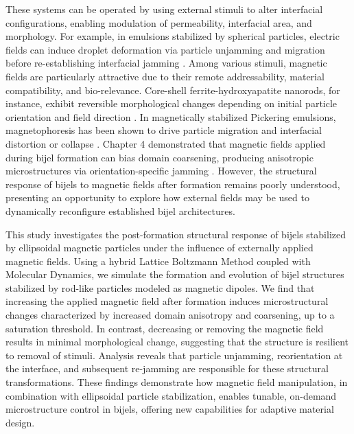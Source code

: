 These systems can be operated by using external stimuli to alter interfacial configurations, 
enabling modulation of permeability, interfacial area, and morphology. For example, in emulsions stabilized by spherical particles, electric fields can induce droplet deformation via 
particle unjamming and migration before re-establishing interfacial jamming \cite{cui_stabilizing_2013}. Among various stimuli, magnetic fields are particularly attractive due to their 
remote addressability, material compatibility, and bio-relevance. Core-shell ferrite-hydroxyapatite nanorods, for instance, exhibit reversible morphological changes depending on initial 
particle orientation and field direction \cite{nakayama_stimuli-responsive_2018}. In magnetically stabilized Pickering emulsions, magnetophoresis has been shown to drive particle migration 
and interfacial distortion or collapse \cite{tham_magnetophoresis_2021, yang_rapid_2020, misra_magnetic_2020}. Chapter 4 demonstrated that magnetic fields applied during bijel formation can 
bias domain coarsening, producing anisotropic microstructures via orientation-specific jamming \cite{karthikeyan_formation_2024}. However, the structural response of bijels to magnetic fields 
after formation remains poorly understood, presenting an opportunity to explore how external fields may be used to dynamically reconfigure established bijel architectures.

This study investigates the post-formation structural response of bijels stabilized by ellipsoidal magnetic particles under the influence of externally applied magnetic fields. 
Using a hybrid Lattice Boltzmann Method coupled with Molecular Dynamics, we simulate the formation and evolution of bijel structures stabilized by rod-like particles modeled as 
magnetic dipoles. We find that increasing the applied magnetic field after formation induces microstructural changes characterized by increased domain anisotropy and 
coarsening, up to a saturation threshold. In contrast, decreasing or removing the magnetic field results in minimal morphological change, suggesting that the structure is
resilient to removal of stimuli. Analysis reveals that particle unjamming, reorientation at the interface, and subsequent re-jamming are responsible for these structural transformations.
These findings demonstrate how magnetic field manipulation, in combination with ellipsoidal particle stabilization, enables tunable, on-demand microstructure 
control in bijels, offering new capabilities for adaptive material design.


